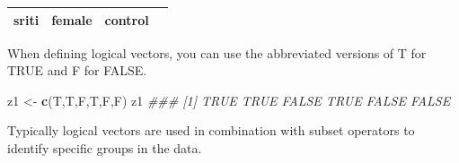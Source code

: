 \documentclass[]{book}
\newenvironment{Shaded}{\begin{snugshade}}{\end{snugshade}}
\newcommand{\CommentTok}[1]{\textcolor[rgb]{0.56,0.35,0.01}{\textit{#1}}}
\newcommand{\DecValTok}[1]{\textcolor[rgb]{0.00,0.00,0.81}{#1}}
\newcommand{\KeywordTok}[1]{\textcolor[rgb]{0.13,0.29,0.53}{\textbf{#1}}}
\newcommand{\NormalTok}[1]{#1}
\newcommand{\OperatorTok}[1]{\textcolor[rgb]{0.81,0.36,0.00}{\textbf{#1}}}
\newcommand{\StringTok}[1]{\textcolor[rgb]{0.31,0.60,0.02}{#1}}
\theoremstyle{definition}
\theoremstyle{definition}
\theoremstyle{definition}
\theoremstyle{remark}
\begin{document}
\begin{longtable}[]{@{}cccc@{}}
\begin{minipage}[t]{0.10\columnwidth}\centering
sriti\strut
\end{minipage} & \begin{minipage}[t]{0.11\columnwidth}\centering
female\strut
\end{minipage} & \begin{minipage}[t]{0.15\columnwidth}\centering
control\strut
\end{minipage} & \begin{minipage}[t]{0.15\columnwidth}\centering
142\strut
\end{minipage}\tabularnewline
\bottomrule
\end{longtable}

\begin{Shaded}
\end{Shaded}

When defining logical vectors, you can use the abbreviated versions of T
for TRUE and F for FALSE.

\begin{Shaded}
\begin{Highlighting}[]
\NormalTok{z1 <-}\StringTok{ }\KeywordTok{c}\NormalTok{(T,T,F,T,F,F)}
\NormalTok{z1}
\CommentTok{### [1]  TRUE  TRUE FALSE  TRUE FALSE FALSE}
\end{Highlighting}
\end{Shaded}

Typically logical vectors are used in combination with subset operators
to identify specific groups in the data.

\begin{Shaded}
\end{Shaded}
\end{document}
